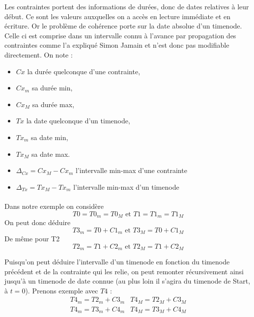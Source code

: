 \documentclass[10pt,a4paper]{article}
\begin{document}
Les contraintes portent des informations de durées, donc de dates relatives à leur début. Ce sont les valeurs auxquelles on a accès en lecture immédiate et en écriture. Or le problème de cohérence porte sur la date absolue d'un timenode. Celle ci est comprise dans un intervalle connu à l'avance par propagation des contraintes comme l'a expliqué Simon Jamain %
et n'est donc pas modifiable directement. On note : 
	\begin{itemize}
		\item $Cx$ la durée quelconque d'une contrainte,
		\item $Cx_m$ sa durée min,
		\item $Cx_M$ sa durée max,
		\item $Tx$ la date quelconque d'un timenode,
		\item $Tx_m$ sa date min,
		\item $Tx_M$ sa date max.
		\item $\Delta_{Cx} = Cx_M - Cx_m$ l'intervalle min-max d'une contrainte
		\item $\Delta_{Tx} = Tx_M - Tx_m$ l'intervalle min-max d'un timenode
	\end{itemize}

\paragraph*{}
Dans notre exemple on considère \begin{equation} T0 = T0_m = T0_M \text{ et } T1 = T1_m = T1_M \end{equation}
On peut donc déduire \begin{equation}T3_m = T0 + C1_m \text{ et } T3_M = T0 + C1_M \label{E:T3}\end{equation}
De même pour T2 \begin{equation}T2_m = T1 + C2_m \text{ et } T2_M = T1 + C2_M \label{E:T2} \end{equation}

Puisqu'on peut déduire l'intervalle d'un timenode en fonction du timenode précédent et de la contrainte qui les relie, on peut remonter récursivement ainsi jusqu'à un timenode de date connue (au plus loin il s'agira du timenode de Start, à $t=0$). Prenons exemple avec $T4$ : 
	\begin{eqnarray} 
		\label{E:coherence}
		T4_m = T2_m + C3_m & T4_M = T2_M + C3_M \\
		T4_m = T3_m + C4_m & T4_M = T3_M + C4_M \nonumber
	\end{eqnarray}
\end{document}
